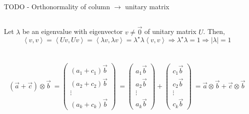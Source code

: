 \documentclass[a4paper,10pt]{hw}
\begin{document}
\subsection{}

TODO - Orthonormality of column $\to$ unitary matrix

\subsection{}

Let $\lambda$ be an eigenvalue with eigenvector $v\neq \vec{0}$ of unitary matrix $U$. Then,
$$
\left\langle v,v \right\rangle = \left\langle Uv,Uv \right\rangle
	= \left\langle \lambda v, \lambda v \right\rangle =  \lambda^\star\lambda \left\langle v,v \right\rangle \Rightarrow \lambda^\star\lambda = 1 \Rightarrow |\lambda | = 1
$$
\section{}

\subsection{}

\subsubsection{}
$$
(\vec{a} + \vec{c}) \otimes \vec{b}
\
=
\begin{pmatrix} 
(a_1 + c_1) \vec{b} \\ (a_2 + c_2) \vec{b} \\ \vdots \\ (a_k + c_k) \vec{b} 
\end{pmatrix}
\
=
\begin{pmatrix} 
a_1 \vec{b} \\ a_2 \vec{b} \\ \vdots \\ a_k \vec{b} 
\end{pmatrix}
+
\begin{pmatrix} 
c_1 \vec{b} \\ c_2 \vec{b} \\ \vdots \\ c_k \vec{b} 
\end{pmatrix}
\
=
\vec{a}\otimes\vec{b} + \vec{c}\otimes\vec{b}
$$
\end{document}
